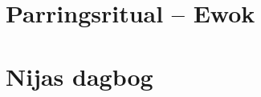 \documentclass[article,10pt,a4,oneside]{memoir}
\begin{document}
\begin{minipage}[b]{1.95\textwidth}
\begin{minipage}[t]{0.23\linewidth}
\vspace{3mm}
\section*{Parringsritual -- Ewok}

\end{minipage}
\hspace{2mm}
\begin{minipage}[t]{0.46\linewidth}



\end{minipage}
\hspace{2mm}
\begin{minipage}[t]{0.23\linewidth}

\vspace{1mm}

\section*{Nijas dagbog}


\end{minipage}
\end{minipage}
\end{document}
